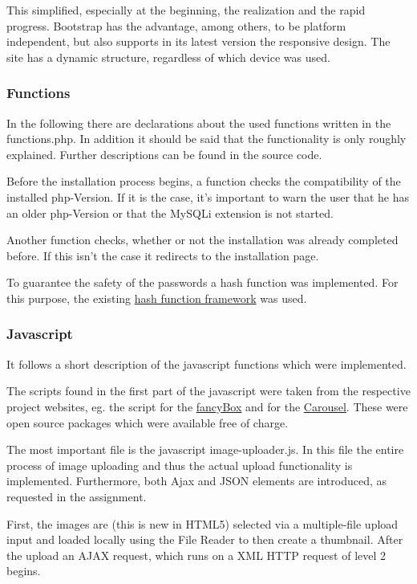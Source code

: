 \documentclass[a4paper,12pt,oneside]{article} %
\begin{document}
This simplified, especially at the beginning, the realization and the rapid progress.
Bootstrap has the advantage, among others, to be platform independent, but also supports in its
latest version the \textquotedbl{}responsive design\textquotedbl{}. The site has a dynamic structure,
regardless of which device was used.

\subsubsection{Functions}
In the following there are declarations about the used functions written in the functions.php.
In addition it should be said that the functionality is only roughly explained. Further descriptions can be found in the source code.

Before the installation process begins, a function checks the compatibility of the installed php-Version. If it is the case, it's important to warn the user that he has an older php-Version or that the MySQLi extension is not started.

Another function checks, whether or not the installation was already completed before. If this isn't the case it redirects to the installation page.

To guarantee the safety of the passwords a hash function was implemented.
For this purpose, the existing \hyperlink{http://www.openwall.com/phpass/}{hash function framework} was used.

\subsubsection{Javascript}
It follows a short description of the javascript functions which were implemented.

The scripts found in the first part of the javascript were taken from the respective project websites, eg. the script for the  \hyperlink{http://fancyapps.com/fancybox/}{fancyBox} and for the \hyperlink{http://getbootstrap.com/javascript/\#carousel}{Carousel}. These were open source packages which were available free of charge.

The most important file is the javascript image-uploader.js.
In this file the entire process of image uploading and thus the actual upload functionality is implemented. Furthermore, both Ajax and JSON elements are introduced, as requested in the assignment.

First, the images are (this is new in HTML5) selected via a multiple-file upload input and loaded locally using the File Reader to then create a thumbnail. After the upload an AJAX request, which runs on a XML HTTP request of level 2 begins.
\end{document}
